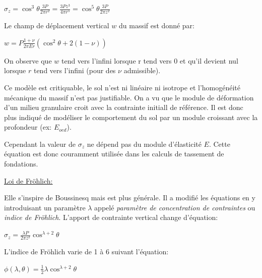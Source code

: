             \begin{center}
                $\sigma_z = \cos^3 \theta \frac{3 P}{2 \pi r^2} = \frac{3 P z^3}{4 \pi r^5} = \cos^5 \theta \frac{3 P}{2 \pi z^2}$
            \end{center} 
            
            Le champ de déplacement vertical $w$ du massif est donné par:
            
            \begin{center}
                $w = P \frac{1+\nu}{2 \pi E r} (\cos^2 \theta + 2(1-\nu))$
            \end{center} 
            
            On observe que $w$ tend vers l'infini lorsque r tend vers 0 et qu'il devient nul lorsque $r$ tend vers l'infini (pour des $\nu$ admissible).
            
            Ce modèle est critiquable, le sol n'est ni linéaire ni isotrope et l'homogénéité mécanique du massif n'est pas justifiable. On a vu que le module de déformation d'un milieu granulaire croit avec la contrainte initiall de référence. Il est donc plus indiqué de modéliser le comportement du sol par un module croissant avec la profondeur (ex: $E_{oed}$).
            
            Cependant la valeur de $\sigma_z$ ne dépend pas du module d'élasticité $E$. Cette équation est donc couramment utilisée dans les calculs de tassement de fondations.
            
            \underline{Loi de Fröhlich:}
            
            Elle s'inspire de Boussinesq mais est plus générale. Il a modifié les équations en y introduisant un paramètre $\lambda$ appelé \textit{paramètre de concentration de contraintes} ou \textit{indice de Fröhlich}. L'apport de contrainte vertical change d'équation:
            
            \begin{center}
                $\sigma_z = \frac{\lambda P}{2 \pi z^2} \cos^{\lambda +2} \theta $
            \end{center} 
            
            L'indice de Fröhlich varie de 1 à 6 suivant l'équation:
            
            \begin{center}
                $\phi(\lambda, \theta) = \frac{1}{2} \lambda \cos^{\lambda+2} \theta$
            \end{center} 
            
